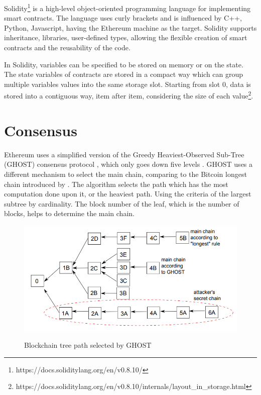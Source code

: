 \documentclass[
    article, 
    12pt,				%
	oneside,			%
	a4paper,			%
	chapter=TITLE,		%
	section=TITLE,		%
	english,			%
	english,				%
	sumario=tradicional
]{abntex2}
\begin{document}
Solidity\footnote{https://docs.soliditylang.org/en/v0.8.10/} is a high-level object-oriented programming language for implementing smart contracts.
The language uses curly brackets and is influenced by C++, Python, Javascript, having the Ethereum machine as the target.
Solidity supports inheritance, libraries, user-defined types, allowing the flexible creation of smart contracts and the reusability of the code.

In Solidity, variables can be specified to be stored on memory or on the state.
The state variables of contracts are stored in a compact way which can group multiple variables values into the same storage slot.
Starting from slot 0, data is stored into a contiguous way, item after item, considering the size of each value\footnote{https://docs.soliditylang.org/en/v0.8.10/internals/layout\_in\_storage.html}.

\section{Consensus} \label{sec:consensus}

Ethereum uses a simplified version of the Greedy Heaviest-Observed Sub-Tree (GHOST) consensus protocol \cite{ghost_sompolinsky_2015}, which only goes down five levels \cite{buterin_eth_whitepaper_2013}.
GHOST uses a different mechanism to select the main chain, comparing to the Bitcoin longest chain introduced by \citeauthor{nakamoto_bitcoin_2008}.
The algorithm selects the path which has the most computation done upon it, or the heaviest path.
Using the criteria of the largest subtree by cardinality.
The block number of the leaf, which is the number of blocks, helps to determine the main chain. 

\begin{figure}[ht]
    \centering
    \caption{Blockchain tree path selected by GHOST}
    \includegraphics[width=\textwidth]{images/ghost_tree.png}
    \label{fig:blockchain_tree}
\end{figure}
\end{document}
